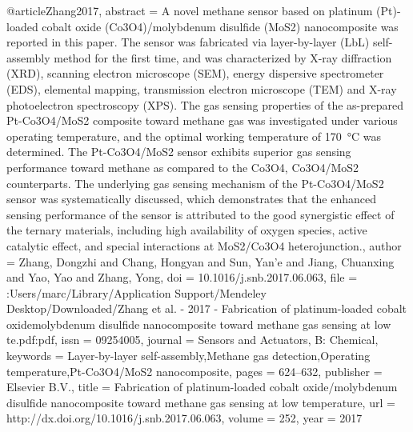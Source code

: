 @article{Zhang2017,
abstract = {A novel methane sensor based on platinum (Pt)-loaded cobalt oxide (Co3O4)/molybdenum disulfide (MoS2) nanocomposite was reported in this paper. The sensor was fabricated via layer-by-layer (LbL) self-assembly method for the first time, and was characterized by X-ray diffraction (XRD), scanning electron microscope (SEM), energy dispersive spectrometer (EDS), elemental mapping, transmission electron microscope (TEM) and X-ray photoelectron spectroscopy (XPS). The gas sensing properties of the as-prepared Pt-Co3O4/MoS2 composite toward methane gas was investigated under various operating temperature, and the optimal working temperature of 170 °C was determined. The Pt-Co3O4/MoS2 sensor exhibits superior gas sensing performance toward methane as compared to the Co3O4, Co3O4/MoS2 counterparts. The underlying gas sensing mechanism of the Pt-Co3O4/MoS2 sensor was systematically discussed, which demonstrates that the enhanced sensing performance of the sensor is attributed to the good synergistic effect of the ternary materials, including high availability of oxygen species, active catalytic effect, and special interactions at MoS2/Co3O4 heterojunction.},
author = {Zhang, Dongzhi and Chang, Hongyan and Sun, Yan'e and Jiang, Chuanxing and Yao, Yao and Zhang, Yong},
doi = {10.1016/j.snb.2017.06.063},
file = {:Users/marc/Library/Application Support/Mendeley Desktop/Downloaded/Zhang et al. - 2017 - Fabrication of platinum-loaded cobalt oxidemolybdenum disulfide nanocomposite toward methane gas sensing at low te.pdf:pdf},
issn = {09254005},
journal = {Sensors and Actuators, B: Chemical},
keywords = {Layer-by-layer self-assembly,Methane gas detection,Operating temperature,Pt-Co3O4/MoS2 nanocomposite},
pages = {624--632},
publisher = {Elsevier B.V.},
title = {{Fabrication of platinum-loaded cobalt oxide/molybdenum disulfide nanocomposite toward methane gas sensing at low temperature}},
url = {http://dx.doi.org/10.1016/j.snb.2017.06.063},
volume = {252},
year = {2017}
}
